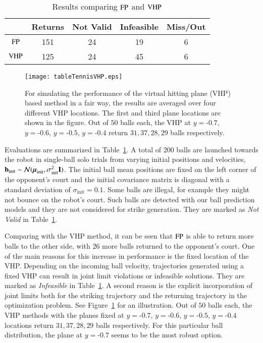 \begin{table}[b!]
\small\sf\centering
\renewcommand{\arraystretch}{1.3}
\caption{Results comparing $\mathrm{FP}$ and $\mathrm{VHP}$}
\label{tableSimResults}
\begin{tabular}{c||c|c|c|c}
\toprule
& {\small \bfseries Returns} & {\small \bfseries Not Valid} & {\small \bfseries Infeasible} & {\small \bfseries Miss/Out} \\
\hline
{\small $\mathrm{FP}$} & 151 & 24 & 19 & 6\\
\hline
{\small $\mathrm{VHP}$} & 125 & 24 & 45 & 6\\
\bottomrule
\end{tabular}
\end{table}
%
\begin{figure}[t!]
\centering
\texttt{[image: tableTennisVHP.eps]}
\caption{For simulating the performance of the virtual hitting plane (VHP) based method in a fair way, the results are averaged over four different VHP locations. The first and third plane locations are shown in the figure. Out of $50$ balls each, the VHP at $y=\mbox{-}0.7$, $y=\mbox{-}0.6$, $y=\mbox{-}0.5$, $y=\mbox{-}0.4$ return $31, 37, 28, 29$ balls respectively.}
\label{vhps}
\end{figure}
%
Evaluations are summarized in Table~\ref{tableSimResults}. A total of $200$ balls are launched towards the robot in single-ball solo trials from varying initial positions and velocities, $\boldsymbol{\mathrm{b}}_{\mathrm{init}} \sim \mathcal{N}(\boldsymbol{\mathrm{\mu}}_{\mathrm{init}}, \sigma_{\mathrm{init}}^2 \boldsymbol{\mathrm{I}})$. The initial ball mean positions are fixed on the left corner of the opponent's court and the initial covariance matrix is diagonal with a standard deviation of $\sigma_{\mathrm{init}} = 0.1$. Some balls are illegal, for example they might not bounce on the robot's court. Such balls are detected with our ball prediction models and they are not considered for strike generation. They are marked as \emph{Not Valid} in Table~\ref{tableSimResults}. 

Comparing with the VHP method, it can be seen that $\mathrm{FP}$ is able to return more balls to the other side, with $26$ more balls returned to the opponent's court. One of the main reasons for this increase in performance is the fixed location of the VHP. Depending on the incoming ball velocity, trajectories generated using a fixed VHP can result in joint limit violations or infeasible solutions. They are marked as \emph{Infeasible} in Table~\ref{tableSimResults}. A second reason is the explicit incorporation of joint limits both for the striking trajectory and the returning trajectory in the optimization problem. See Figure~\ref{vhps} for an illustration. Out of $50$ balls each, the VHP methods with the planes fixed at $y=\mbox{-}0.7$, $y=\mbox{-}0.6$, $y=\mbox{-}0.5$, $y=\mbox{-}0.4$ locations return $31, 37, 28, 29$ balls respectively. For this particular ball distribution, the plane at $y = \mbox{-}0.7$ seems to be the most robust option.

